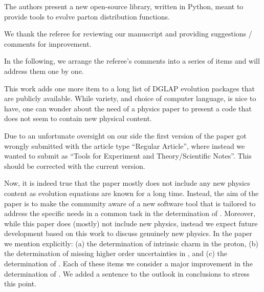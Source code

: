 \documentclass[a4paper,11pt]{article}
\newcounter{comment}[section]
\begin{document}
 

\begin{response}{
The authors present a new open-source library, written in Python, meant to
provide tools to evolve parton distribution functions.}

We thank the referee for reviewing our manuscript and providing suggestions / comments for improvement.

In the following, we arrange the referee's comments into a series of items and 
will address them one by one.

\end{response}



\begin{response}{
This work adds one more item to a long list of DGLAP evolution packages that are
publicly available. While variety, and choice of computer language, is nice to
have, one can wonder about the need of a physics paper to present a code that
does not seem to contain new physical content.}

Due to an unfortunate oversight on our side the first version of the paper got wrongly submitted with
the article type \enquote{Regular Article}, where instead we wanted to submit as
\enquote{Tools for Experiment and Theory/Scientific Notes}. This should be corrected with the current version.

Now, it is indeed true that the paper mostly does not include any new physics content as
\dglap{} evolution equations are known for a long time. Instead, the aim of the paper
is to make the community aware of a new software tool that is tailored to address the specific needs in a common
task in the determination of \pdfs. Moreover, while this paper does (mostly) not include
new physics, instead we expect future development based on this work to discuss
genuinely new physics. In the paper we mention explicitly: (a) the determination of
intrinsic charm in the proton, (b) the determination of missing higher order
uncertainties in \pdf{}, and (c) the determination of \nnnlo{} \pdfs. Each of these
items we consider a major improvement in the determination of \pdfs.
We added a sentence to the outlook in conclusions to stress this point.

\end{response}
\end{document}
